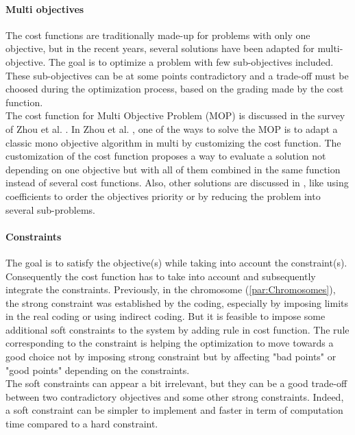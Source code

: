 \paragraph*{Multi objectives}
The cost functions are traditionally made-up for  problems with only one objective, but in the recent years, several solutions have been adapted for multi-objective. The goal is to optimize a problem with few sub-objectives included. These sub-objectives can be at some points contradictory and a trade-off must be choosed during the optimization process, based on the grading made by the cost function. \\
 The cost function for Multi Objective Problem (MOP) is discussed in the survey of Zhou et al. \cite{75*zhou2011}. In Zhou et al. \cite{75*zhou2011}, one of the ways to solve the MOP is to adapt a classic mono objective algorithm in multi by customizing the cost function. The customization of the cost function proposes a way to evaluate a solution not depending on one objective but with all of them combined in the same function instead of several cost functions. 
 Also, other solutions are discussed in \cite{75*zhou2011}, like using coefficients to order the objectives priority or by reducing the problem into several sub-problems. \\ %

\paragraph*{Constraints}
The goal is to satisfy the objective(s) while taking into account the constraint(s). Consequently the cost function has to take into account and subsequently integrate the constraints. 
 Previously, in the chromosome (\ref{par:Chromosomes}), the strong constraint was established by the coding, especially by imposing limits in the real coding or using indirect coding. But it is feasible to impose some additional soft constraints to the system by adding rule in cost function. The rule corresponding to the constraint is helping the optimization to move towards a good choice not by imposing strong constraint but by affecting "bad points" or "good points" depending on the constraints. \\
 The soft constraints can appear a bit irrelevant, but they can be a good trade-off between two contradictory objectives and some other strong constraints. Indeed, a soft constraint can be simpler to implement and faster in term of computation time compared to a hard constraint.  

